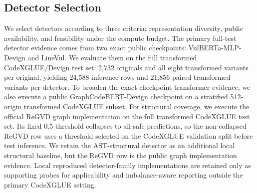 \documentclass[a4paper,fleqn]{cas-dc}
\begin{document}
\subsection{Detector Selection}

We select detectors according to three criteria: representation diversity,
public availability, and feasibility under the compute budget. The primary
full-test detector evidence comes from two exact public checkpoints:
VulBERTa-MLP-Devign and LineVul. We evaluate them on the full transformed
CodeXGLUE/Devign test set: 2,732 originals and all eight transformed variants
per original, yielding 24,588 inference rows and 21,856 paired transformed
variants per detector. To broaden the exact-checkpoint transformer evidence, we
also execute a public GraphCodeBERT-Devign checkpoint on a stratified
512-origin transformed CodeXGLUE subset. For structural coverage, we execute
the official ReGVD graph implementation on the full transformed CodeXGLUE test
set. Its fixed 0.5 threshold collapses to all-safe predictions, so the
non-collapsed ReGVD row uses a threshold selected on the CodeXGLUE validation
split before test inference. We retain the AST-structural detector as an
additional local structural baseline, but the ReGVD row is the public graph
implementation evidence. Local reproduced detector-family implementations are
retained only as supporting probes for applicability and imbalance-aware
reporting outside the primary CodeXGLUE setting.
\end{document}
